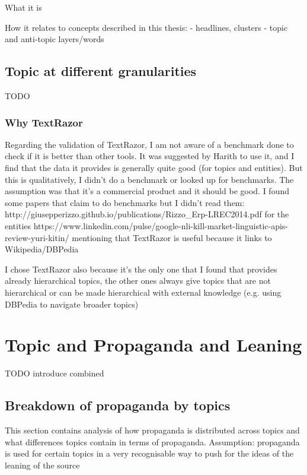What it is

How it relates to concepts described in this thesis:
- headlines, clusters
- topic and anti-topic layers/words

\subsection{Topic at different granularities}

TODO

\subsubsection{Why TextRazor}
Regarding the validation of TextRazor, I am not aware of a benchmark done to check if it is better than other tools. It was suggested by Harith to use it, and I find that the data it provides is generally quite good (for topics and entities). But this is qualitatively, I didn’t do a benchmark or looked up for benchmarks. The assumption was that it’s a commercial product and it should be good.
I found some papers that claim to do benchmarks but I didn’t read them:
http://giusepperizzo.github.io/publications/Rizzo\_Erp-LREC2014.pdf for the entities
https://www.linkedin.com/pulse/google-nli-kill-market-linguistic-apis-review-yuri-kitin/ mentioning that TextRazor is useful because it links to Wikipedia/DBPedia

I chose TextRazor also because it’s the only one that I found that provides already hierarchical topics, the other ones always give topics that are not hierarchical or can be made hierarchical with external knowledge (e.g. using DBPedia to navigate broader topics)

\section{Topic and Propaganda and Leaning}

TODO introduce combined

\subsection{Breakdown of propaganda by topics}

This section contains analysis of how propaganda is distributed across topics and what differences topics contain in terms of propaganda.
Assumption: propaganda is used for certain topics in a very recognisable way to push for the ideas of the leaning of the source

